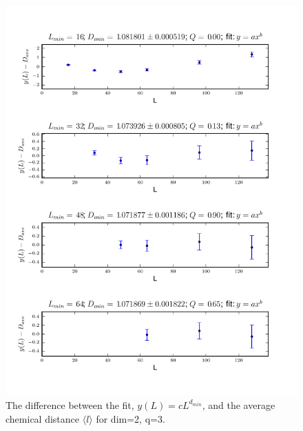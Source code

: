 \documentclass[pre,preprint]{revtex4}
\newcommand{\lb}{{\langle}}
\newcommand{\rb}{{\rangle}}
\begin{document}
\begin{figure}[htp]
\centering
\includegraphics[width=.85\textwidth]{figures/d_min_D2q3_46_fig}
\caption{The difference between the fit, $y(L)=cL^{d_{min}}$, and the average chemical distance $\lb l \rb$ for dim=2, q=3.}\label{fig:4}
\end{figure}

\end{document}
